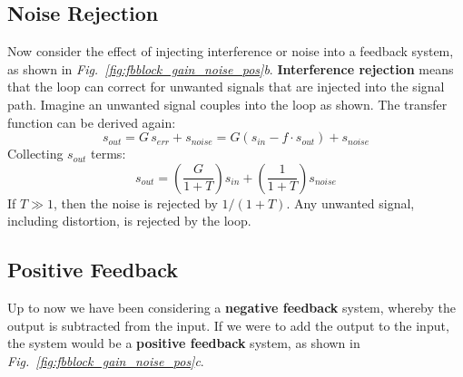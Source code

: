 \subsection{Noise Rejection}
Now consider the effect of injecting interference or noise into a feedback system, as shown in \emph{Fig.~\ref{fig:fbblock_gain_noise_pos}b}. \textbf{Interference rejection} means that the loop can correct for unwanted signals that are injected into the signal path.  Imagine an unwanted signal couples into the loop as shown.  The transfer function can be derived again:
    \begin{equation}
        s_{out} = G\,s_{err} + s_{noise} = G(s_{in} - f \cdot s_{out}) + s_{noise}
    \end{equation}
Collecting $s_{out}$ terms:
    \begin{equation}
        s_{out} = \left(\frac{G}{1 + T}\right)s_{in} + \left(\frac{1}{1 + T}\right)s_{noise}
    \end{equation}
If $T \gg 1$, then the noise is rejected by $1/(1+T)$. Any unwanted signal, including distortion, is rejected by the loop.
\subsection{Positive Feedback}
Up to now we have been considering a \textbf{negative feedback} system, whereby the output is subtracted from the input. If we were to add the output to the input, the system would be a \textbf{positive feedback} system, as shown in \emph{Fig.~\ref{fig:fbblock_gain_noise_pos}c}.

